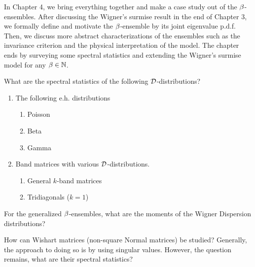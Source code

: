 In Chapter 4, we bring everything together and make a case study out of the $\beta$-ensembles. After discussing the Wigner's surmise result in the end of Chapter 3, we formally define and motivate the $\beta$-ensemble by its joint eigenvalue p.d.f. Then, we discuss more abstract characterizations of the ensembles such as the invariance criterion and the physical interpretation of the model. The chapter ends by surveying some spectral statistics and extending the Wigner's surmise model for any $\beta \in \mathbb{N}$.

\newpage

\medskip
 What are the spectral statistics of the following $\mathcal{D}$-distributions?

\begin{enumerate}
  \item The following e.h. distributions
    \begin{enumerate}
      \item Poisson
      \item Beta
      \item Gamma
    \end{enumerate}
  \item Band matrices with various $\mathcal{D}$-distributions.
    \begin{enumerate}
      \item General $k$-band matrices
      \item Tridiagonals ($k = 1$)
    \end{enumerate}
\end{enumerate}

\medskip
 For the generalized $\beta$-ensembles, what are the moments of the Wigner Dispersion distributions?

\medskip
 How can Wishart matrices (non-square Normal matrices) be studied?
Generally, the approach to doing so is by using singular values. However, the question remains, what are their spectral statistics?
